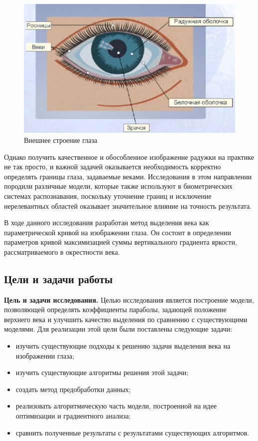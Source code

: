 \documentclass[12pt]{article} %
\begin{document}
\begin{figure}[h]
	
	\centering
	
	\includegraphics[width=0.6\linewidth]{glaz.jpg}
	
	\caption{Внешнее строение глаза}
	
	\label{fig:glaz}
	
\end{figure}

Однако получить качественное и обособленное изображение радужки на практике не так просто, и важной задачей оказывается необходимость корректно определять границы глаза, задаваемые веками. Исследования в этом направлении породили различные модели, которые также используют в биометрических системах распознавания, поскольку уточнение границ и исключение нерелевантных областей оказывает значительное влияние на точность результата.

В ходе данного исследования разработан метод выделения века как параметрической кривой на изображении глаза. Он состоит в определении параметров кривой максимизацией суммы вертикального градиента яркости, рассматриваемого в окрестности века.
 

\newpage
\subsection{Цели и задачи работы}

\textbf{Цель и задачи исследования.} Целью исследования является построение модели, позволяющей определять коэффициенты параболы, задающей положение верхнего века и улучшить качество выделения по сравнению с существующими моделями. Для реализации этой цели были поставлены следующие задачи:
\begin{itemize}
	\item изучить существующие подходы к решению задачи выделения века на изображении глаза;
	\item изучить существующие алгоритмы решения этой задачи;
	\item создать метод предобработки данных;
	\item реализовать алгоритмическую часть модели, построенной на идее оптимизации и градиентного анализа;
	\item сравнить полученные результаты с результатами существующих алгоритмов.
\end{itemize}
\end{document}
